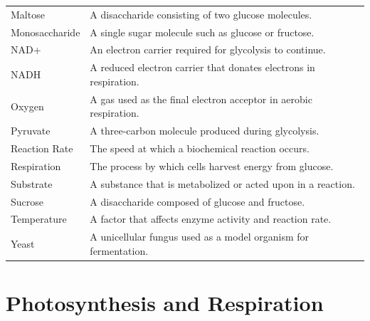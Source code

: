 \documentclass[
  letterpaper,
  DIV=11,
  numbers=noendperiod]{scrreprt}
\begin{document}
{\begin{longtable}[]{@{}
  >{\raggedright\arraybackslash}p{}
  >{\raggedright\arraybackslash}p{}@{}}
Maltose & A disaccharide consisting of two glucose molecules. \\
Monosaccharide & A single sugar molecule such as glucose or fructose. \\
NAD+ & An electron carrier required for glycolysis to continue. \\
NADH & A reduced electron carrier that donates electrons in
respiration. \\
Oxygen & A gas used as the final electron acceptor in aerobic
respiration. \\
Pyruvate & A three-carbon molecule produced during glycolysis. \\
Reaction Rate & The speed at which a biochemical reaction occurs. \\
Respiration & The process by which cells harvest energy from glucose. \\
Substrate & A substance that is metabolized or acted upon in a
reaction. \\
Sucrose & A disaccharide composed of glucose and fructose. \\
Temperature & A factor that affects enzyme activity and reaction
rate. \\
Yeast & A unicellular fungus used as a model organism for
fermentation. \\
\end{longtable}
}


\chapter{\texorpdfstring{\textbf{Photosynthesis and
Respiration}}{Photosynthesis and Respiration}}\label{photosynthesis-and-respiration}
\end{document}
